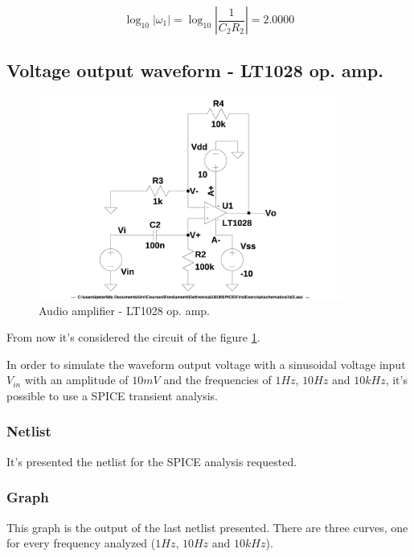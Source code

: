 \documentclass[10pt,a4paper]{article}
\begin{document}
\begin{equation} \label{eq:omega_1log}
  \log_{10} |\omega_1| =
  \log_{10} \left| \frac{1}{C_2R_2} \right|= 2.0000
\end{equation}

\subsection{Voltage output waveform - LT1028 op. amp.}
\begin{figure}[h]
  \centering
  \includegraphics[width=10cm]{schematics/1d2.jpg}
  \caption{Audio amplifier - LT1028 op. amp.}
  \label{1d2schematics}
\end{figure}

From now it's considered the circuit of the figure \ref{1d2schematics}.\par
\medskip
In order to simulate the waveform output voltage with a sinusoidal voltage input $V_{in}$ with an amplitude of $10mV$ and the frequencies of $1Hz$, $10Hz$ and $10kHz$, it's possible to use a SPICE transient analysis.\\

\subsubsection{Netlist}
It's presented the netlist for the SPICE analysis requested.\\


\subsubsection{Graph}
This graph is the output of the last netlist presented. There are three curves, one for every frequency analyzed ($1Hz$, $10Hz$ and $10kHz$).\\
\end{document}
